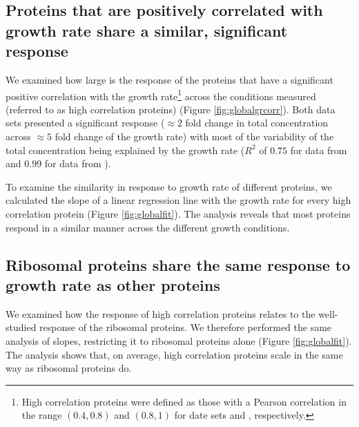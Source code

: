 \documentclass[a4paper,landscape,17pt]{extarticle}
\begin{document}
\clearpage        
\subsection*{Proteins that are positively correlated with growth rate share a similar, significant response}
We examined how large is the response of the proteins that have a significant positive correlation with the growth rate\footnote{High correlation proteins were defined as those with a Pearson correlation in the range $(0.4,0.8)$ and $(0.8,1)$ for date sets \parencite{Heinemann2014} and \parencite{Valgepea2013}, respectively.} across the conditions measured (referred to as high correlation proteins) (Figure \ref{fig:globalgrcorr}).
Both data sets presented a significant response ($\approx 2$ fold change in total concentration across $\approx 5$ fold change of the growth rate) with most of the variability of the total concentration being explained by the growth rate ($R^2$ of $0.75$ for data from \parencite{Heinemann2014} and $0.99$ for data from \parencite{Valgepea2013}). 

To examine the similarity in response to growth rate of different proteins, we calculated the slope of a linear regression line with the growth rate for every high correlation protein (Figure \ref{fig:globalfit}).
The analysis reveals that most proteins respond in a similar manner across the different growth conditions.

\subsection*{Ribosomal proteins share the same response to growth rate as other proteins}
We examined how the response of high correlation proteins relates to the well-studied response of the ribosomal proteins.
We therefore performed the same analysis of slopes, restricting it to ribosomal proteins alone (Figure \ref{fig:globalfit}).
The analysis shows that, on average, high correlation proteins scale in the same way as ribosomal proteins do.
\clearpage        
\end{document}
